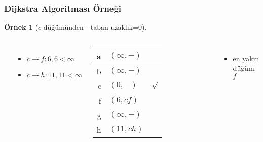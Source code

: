 \documentclass[dvipsnames]{beamer}
\theoremstyle{definition}
\theoremstyle{example}
\newtheorem{ornek}[theorem]{Örnek}
\theoremstyle{plain}
\begin{document}
\begin{frame}
  \frametitle{Dijkstra Algoritması Örneği}

  \begin{ornek}[$c$ düğümünden - taban uzaklık=$0$]
    \begin{columns}
      \begin{center}
      \end{center}

      \begin{itemize}
        \item $c \rightarrow f: 6, 6 < \infty$
        \item $c \rightarrow h: 11, 11 < \infty$
      \end{itemize}

      \pause
      \begin{table}
        \begin{tabular}{r|l|c}
          a & $(\infty,-)$ & \\\hline
          b & $(\infty,-)$ & \\\hline
          c & $(0,-)$      & $\surd$ \\\hline
          f & $(6,cf)$     & \\\hline
          g & $(\infty,-)$ & \\\hline
          h & $(11,ch)$    &
        \end{tabular}
      \end{table}

      \pause
      \begin{itemize}
        \item en yakın düğüm: $f$
      \end{itemize}
    \end{columns}
  \end{ornek}
\end{frame}
\end{document}
